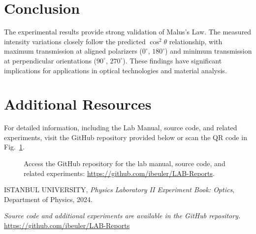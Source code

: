 \documentclass[journal]{IEEEtran}
\begin{document}
\section{Conclusion}
The experimental results provide strong validation of Malus's Law. The measured intensity variations closely follow the predicted $\cos^2\theta$ relationship, with maximum transmission at aligned polarizers ($0^\circ$, $180^\circ$) and minimum transmission at perpendicular orientations ($90^\circ$, $270^\circ$). These findings have significant implications for applications in optical technologies and material analysis.

\section{Additional Resources}
For detailed information, including the Lab Manual, source code, and related experiments, visit the GitHub repository provided below or scan the QR code in Fig.~\ref{fig:qr_code}.

\begin{figure}[H]
    \centering
    \begin{minipage}{0.15\textwidth}
        \centering
    \end{minipage}%
    \begin{minipage}{0.2\textwidth}
        \raggedright
        \caption{Access the GitHub repository for the lab manual, source code, and related experiments: \href{https://github.com/ibeuler/LAB-Reports}{\url{https://github.com/ibeuler/LAB-Reports}}.}
        \label{fig:qr_code}
    \end{minipage}
\end{figure}

\begin{thebibliography}{9}
    ISTANBUL UNIVERSITY, \textit{Physics Laboratory II Experiment Book: Optics}, Department of Physics, 2024.

    \textit{Source code and additional experiments are available in the GitHub repository.} \url{https://github.com/ibeuler/LAB-Reports}
\end{thebibliography}
\end{document}
